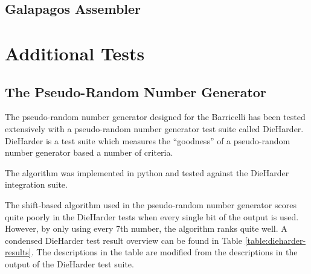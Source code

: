 \subsection{Galapagos Assembler}


\section{Additional Tests}

\subsection{The Pseudo-Random Number Generator}


The pseudo-random number generator designed for the Barricelli has been tested extensively with a pseudo-random number generator test suite called DieHarder\cn.
DieHarder is a test suite which measures the ``goodness'' of a pseudo-random number generator based a number of criteria.

The algorithm was implemented in python and tested against the DieHarder integration suite\cn.

The shift-based algorithm used in the pseudo-random number generator scores quite poorly in the DieHarder tests when every single bit of the output is used.
However, by only using every 7th number\cn, the algorithm ranks quite well.
A condensed DieHarder test result overview can be found in Table \vref{table:dieharder-results}.
The descriptions in the table are modified from the descriptions in the output of the DieHarder test suite.

